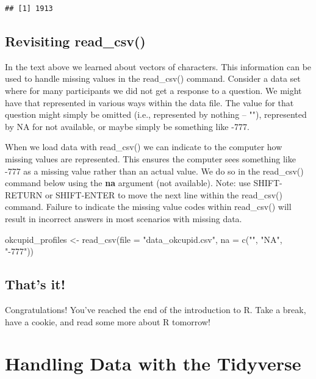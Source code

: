 \documentclass[
]{krantz}
\makeatletter
\newenvironment{Shaded}{\begin{snugshade}}{\end{snugshade}}
\newcommand{\AttributeTok}[1]{\textcolor[rgb]{0.61,0.61,0.61}{#1}}
\newcommand{\FunctionTok}[1]{\textcolor[rgb]{0,0,0}{#1}}
\newcommand{\NormalTok}[1]{#1}
\newcommand{\OtherTok}[1]{\textcolor[rgb]{0.37,0.37,0.37}{#1}}
\newcommand{\StringTok}[1]{\textcolor[rgb]{0.5,0.5,0.5}{#1}}
\newenvironment{kframe}{%
\medskip{}
\setlength{\fboxsep}{.8em}
 \def\at@end@of@kframe{}%
 \ifinner\ifhmode%
  \def\at@end@of@kframe{\end{minipage}}%
  \begin{minipage}{\columnwidth}%
 \fi\fi%
 \def\FrameCommand##1{\hskip\@totalleftmargin \hskip-\fboxsep
 \colorbox{shadecolor}{##1}\hskip-\fboxsep
     \hskip-\linewidth \hskip-\@totalleftmargin \hskip\columnwidth}%
 \MakeFramed {\advance\hsize-\width
   \@totalleftmargin\z@ \linewidth\hsize
   \@setminipage}}%
 {\par\unskip\endMakeFramed%
 \at@end@of@kframe}
\renewenvironment{Shaded}{\begin{kframe}}{\end{kframe}}
\makeatother
\begin{document}
\begin{verbatim}
## [1] 1913
\end{verbatim}

\hypertarget{revisiting-read_csv}{%
\section{Revisiting read\_csv()}\label{revisiting-read_csv}}

In the text above we learned about vectors of characters. This information can be used to handle missing values in the read\_csv() command. Consider a data set where for many participants we did not get a response to a question. We might have that represented in various ways within the data file. The value for that question might simply be omitted (i.e., represented by nothing -- ""), represented by NA for not available, or maybe simply be something like -777.

When we load data with read\_csv() we can indicate to the computer how missing values are represented. This ensures the computer sees something like -777 as a missing value rather than an actual value. We do so in the read\_csv() command below using the \textbf{na} argument (not available). Note: use SHIFT-RETURN or SHIFT-ENTER to move the next line within the read\_csv() command. Failure to indicate the missing value codes within read\_csv() will result in incorrect answers in most scenarios with missing data.

\begin{Shaded}
\begin{Highlighting}[]
\NormalTok{okcupid\_profiles }\OtherTok{\textless{}{-}} \FunctionTok{read\_csv}\NormalTok{(}\AttributeTok{file =} \StringTok{"data\_okcupid.csv"}\NormalTok{,}
                             \AttributeTok{na =} \FunctionTok{c}\NormalTok{(}\StringTok{""}\NormalTok{, }\StringTok{"NA"}\NormalTok{, }\StringTok{"{-}777"}\NormalTok{))}
\end{Highlighting}
\end{Shaded}

\hypertarget{thats-it}{%
\section{That's it!}\label{thats-it}}

Congratulations! You've reached the end of the introduction to R. Take a break, have a cookie, and read some more about R tomorrow!

\hypertarget{handling-data-with-the-tidyverse}{%
\chapter{Handling Data with the Tidyverse}\label{handling-data-with-the-tidyverse}}
\end{document}
